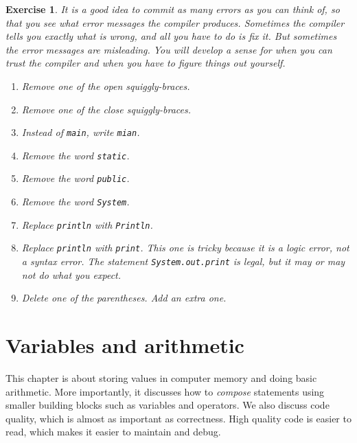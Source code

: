 \documentclass[12pt]{book}
\theoremstyle{exercise}
\newtheorem{exercise}{Exercise}[chapter]
\newcommand{\java}[1]{\verb"#1"}
\newcommand{\java}[1]{\lstinline{#1}} %
\begin{document}
\begin{exercise}

It is a good idea to commit as many errors as you can think of, so that you see what error messages the compiler produces.
Sometimes the compiler tells you exactly what is wrong, and all you have to do is fix it.
But sometimes the error messages are misleading.
You will develop a sense for when you can trust the compiler and when you have to figure things out yourself.

\begin{enumerate}
\item Remove one of the open squiggly-braces.
\item Remove one of the close squiggly-braces.
\item Instead of \java{main}, write \java{mian}.
\item Remove the word \java{static}.
\item Remove the word \java{public}.
\item Remove the word \java{System}.
\item Replace \java{println} with \java{Println}.
\item Replace \java{println} with \java{print}.
This one is tricky because it is a logic error, not a syntax error.
The statement \java{System.out.print} is legal, but it may or may not do what you expect.
\item Delete one of the parentheses.
Add an extra one.
\end{enumerate}

\end{exercise}


\chapter{Variables and arithmetic}

This chapter is about storing values in computer memory and doing basic arithmetic.
More importantly, it discusses how to {\em compose} statements using smaller building blocks such as variables and operators.
We also discuss code quality, which is almost as important as correctness.
High quality code is easier to read, which makes it easier to maintain and debug.

\end{document}
